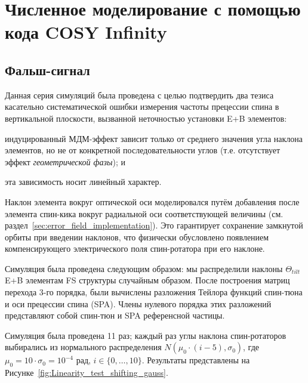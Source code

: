 \chapter{Численное моделирование с помощью кода COSY Infinity} \label{chpt:simulation}

\section{Фальш-сигнал} \label{sec:simulation-fake_signal}
Данная серия симуляций была проведена с целью подтвердить два тезиса
касательно систематической ошибки измерения частоты прецессии спина в
вертикальной плоскости, вызванной неточностью установки E+B элементов:
\begin{enumerate*}[1)]
	\item индуцированный МДМ-эффект зависит только от среднего значения
	угла наклона элементов, но не от  конкретной последовательности
	углов (т.е. отсутствует эффект \emph{геометрической фазы}); и
	\item эта зависимость носит линейный характер.
\end{enumerate*}

Наклон элемента вокруг оптической оси моделировался путём добавления
после элемента спин-кика вокруг радиальной оси соответствующей
величины (см. раздел~\ref{sec:error_field_implementation}). Это
гарантирует сохранение замкнутой орбиты при введении наклонов, что
физически обусловлено появлением компенсирующего электрического поля 
спин-ротатора при его наклоне.

Симуляция была проведена следующим образом: мы распределили наклоны
$\Theta_{tilt}$ E+B элементам FS структуры случайным образом. После
построения матриц перехода 3-го порядка, были вычислены разложения
Тейлора функций спин-тюна и оси прецессии спина (SPA). Члены нулевого
порядка этих разложений представляют собой спин-тюн и SPA референсной частицы.

Симуляция была проведена 11 раз; каждый раз углы наклона
спин-ротаторов выбирались из нормального распределения
$N(\mu_0\cdot(i-5), \sigma_0)$, где $\mu_0 = 10\cdot \sigma_0 =
10^{-4}$ рад, $i\in\lbrace0,\dots, 10\rbrace$. Результаты представлены
на Рисунке~\ref{fig:Linearity_test_shifting_gauss}.


